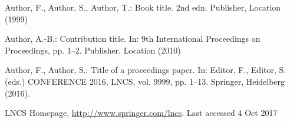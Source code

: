 \documentclass[runningheads]{llncs}
\begin{document}
\begin{thebibliography}{8}
Author, F., Author, S., Author, T.: Book title. 2nd edn. Publisher,
Location (1999)

Author, A.-B.: Contribution title. In: 9th International Proceedings
on Proceedings, pp. 1--2. Publisher, Location (2010)

Author, F., Author, S.: Title of a proceedings paper. In: Editor,
F., Editor, S. (eds.) CONFERENCE 2016, LNCS, vol. 9999, pp. 1--13.
Springer, Heidelberg (2016). 

LNCS Homepage, \url{http://www.springer.com/lncs}. Last accessed 4
Oct 2017
\end{thebibliography}
\end{document}
